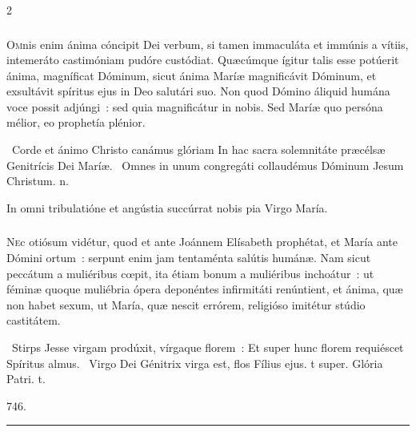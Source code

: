 \documentclass[9pt,twoside]{extarticle}
\begin{document}
\begin{multicols}{2}
{{\subsubsection*{\center {}}
\lettrine{O}mnis enim ánima cóncipit Dei verbum, si tamen immaculáta et immúnis a vítiis, intemeráto castimóniam pudóre custódiat. Quæcúmque ígitur talis esse potúerit ánima, magníficat Dóminum, sicut ánima Maríæ magnificávit Dóminum, et exsultávit spíritus ejus in Deo salutári suo. Non quod Dómino áliquid humána voce possit adjúngi~: sed quia magnificátur in nobis. Sed Maríæ quo persóna mélior, eo prophetía plénior.

\begin{tightlist}{}
\item {}~Corde et ánimo Christo canámus glóriam \textred{*} In hac sacra solemnitáte præcélsæ Genitrícis Dei Maríæ. ~Omnes in unum congregáti collaudémus Dóminum Jesum Christum. n.
\item {} In omni tribulatióne et angústia succúrrat nobis pia Virgo María.
\end{tightlist}

\subsubsection*{\center {}}
\lettrine{N}ec otiósum vidétur, quod et ante Joánnem Elísabeth prophétat, et María ante Dómini ortum~: serpunt enim jam tentaménta salútis humánæ. Nam sicut peccátum a muliéribus cœpit, ita étiam bonum a muliéribus inchoátur~: ut féminæ quoque muliébria ópera deponéntes infirmitáti renúntient, et ánima, quæ non habet sexum, ut María, quæ nescit errórem, religióso imitétur stúdio castitátem.

\begin{tightlist}{}
\item {}~Stirps Jesse virgam prodúxit, vírgaque florem~: \textred{*} Et super hunc florem requiéscet Spíritus almus. ~Virgo Dei Génitrix virga est, flos Fílius ejus. t super. Glória Patri. t.
\item {} 746.
\end{tightlist}

\begin{center}\textcolor{red}{\rule{\linewidth}{0.5pt}} \end{center}

}}
\end{multicols}
\end{document}
